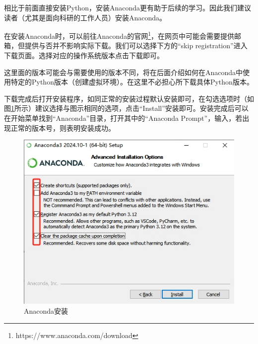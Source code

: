 相比于前面直接安装Python，安装Anaconda更有助于后续的学习。因此我们建议读者（尤其是面向科研的工作人员）安装Anaconda。

在安装Anaconda时，可以前往Anaconda的官网\footnote{https://www.anaconda.com/download}，在网页中可能会需要提供邮箱，但提供与否并不影响实际下载。我们可以选择下方的“skip registration”进入下载页面。选择对应的操作系统版本点击下载即可。

\begin{attention}
    这里面的版本可能会与需要使用的版本不同，将在后面介绍如何在Anaconda中使用特定的Python版本（创建虚拟环境）。在这里不必担心所下载具体Python版本。
\end{attention}

下载完成后打开安装程序，如同正常的安装过程默认安装即可，在勾选选项时（如图\ref{fig:安装Python-Anaconda安装}所示）建议选择与图示相同的选项，点击“Install”安装即可。安装完成后可以在开始菜单找到“Anaconda”目录，打开其中的“Anaconda Prompt”，输入，若出现正常的版本号，则表明安装成功。

\begin{figure}
    \centering
    \includegraphics[width=1\linewidth]{Python与机器学习/基础Python语法/安装Python/fig/Anaconda安装.png}
    \caption{Anaconda安装}
    \label{fig:安装Python-Anaconda安装}
\end{figure}

